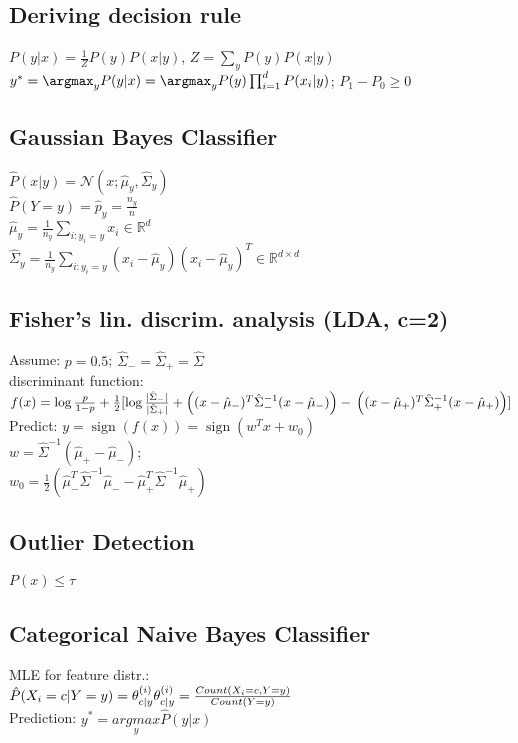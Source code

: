 \subsection*{Deriving decision rule}
$P(y|x) = \frac{1}{Z} P(y)P(x|y)$, $Z = \sum_y P(y) P(x|y)$\\
$y^* = \argmax_y P(y|x) = 
\argmax_y P(y) \prod_{i=1}^d P(x_i|y)$;
$P_1-P_0\geq0$

\subsection*{Gaussian Bayes Classifier}
$\hat{P}(x|y) = \mathcal{N}(x ; \hat{\mu}_y, \hat{\Sigma}_y)$\\
$\hat{P}(Y=y) = \hat{p}_y = \frac{n_y}{n}$\\
$\hat{\mu}_{y} = \frac{1}{n_y} \sum_{i:y_i=y} x_i \in \mathbb{R}^d$\\
$\hat{\Sigma}_{y} = \frac{1}{n_y} \sum_{i:y_i=y} (x_i - \hat{\mu}_{y})(x_i-\hat{\mu}_y)^T \in \mathbb{R}^{d \times d}$

\subsection*{Fisher's lin. discrim. analysis (LDA, c=2)}
Assume: $p = 0.5$; $\hat{\Sigma}_- = \hat{\Sigma}_+ = \hat{\Sigma}$\\
discriminant function: 
$f(x) = \operatorname{log} \frac{p}{1-p} + \\
\frac{1}{2}[\operatorname{log} \frac{|\hat{\Sigma}_-|}{|\hat{\Sigma}_+|}
+ \left((x - \hat{\mu}_-)^T \hat{\Sigma}_-^{-1} (x - \hat{\mu}_-)\right) - \\
\left((x - \hat{\mu}_+)^T \hat{\Sigma}_+^{-1} (x - \hat{\mu}_+)\right)]$\\
Predict: $y = \operatorname{sign}(f(x)) = \operatorname{sign} (w^T x + w_0)$\\
$w = \hat{\Sigma}^{-1}(\hat{\mu}_+ - \hat{\mu}_-)$; \\
$w_0 = \frac{1}{2}(\hat{\mu}_-^T\hat{\Sigma}^{-1}\hat{\mu}_- - \hat{\mu}_+^T \hat{\Sigma}^{-1}\hat{\mu}_+)$

\subsection*{Outlier Detection}
$P(x) \leq \tau$

\subsection*{Categorical Naive Bayes Classifier}
MLE for feature distr.:\\
$\hat{P}(X_i = c|Y = y) = \theta_{c|y}^{(i)}\\
\theta_{c|y}^{(i)} = \frac{Count(X_i = c, Y = y)}{Count(Y=y)}$\\
Prediction: $y^* = \underset{y}{argmax}\hat{P}(y|x)$